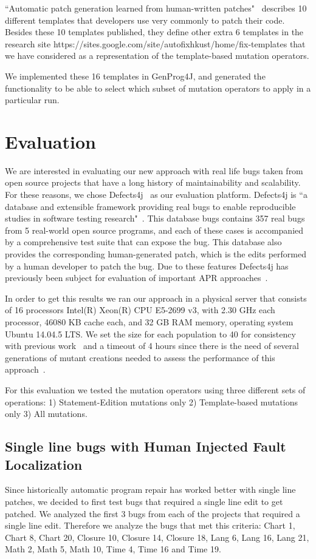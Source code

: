 \documentclass[conference]{IEEEtran}
\begin{document}
``Automatic patch generation learned from human-written patches"~\cite{kim2013} describes 10 different templates that 
developers use very commonly to patch their code. Besides these 10 templates 
published, they define other extra 6 templates in the research site 
https://sites.google.com/site/autofixhkust/home/fix-templates that we have 
considered as a representation of the template-based mutation operators.

We implemented these 16 templates in GenProg4J, and generated the functionality 
to be able to select which subset of mutation operators to apply in a particular 
run.

\section{Evaluation}
We are interested in evaluating our new approach with real life bugs taken from 
open source projects that have a long history of maintainability and 
scalability. For these reasons, we chose Defects4j~\cite{just14} as our 
evaluation platform. Defects4j is ``a database and extensible 
framework providing real bugs to enable reproducible studies in software testing 
research"~\cite{just14}. This database bugs contains 357 real bugs from 5 
real-world open source programs, and each of these cases is accompanied by a 
comprehensive test suite that can expose the bug. This database also provides 
the corresponding human-generated patch, which is the edits performed by a human 
developer to patch the bug. Due to these features Defects4j has previously been 
subject for evaluation of important APR approaches~\cite{Durieux15}.

In order to get this results we ran our approach in a physical server that 
consists of 16 processors Intel(R) Xeon(R) CPU E5-2699 v3, with 2.30 GHz each 
processor, 46080 KB cache each, and 32 GB RAM memory, operating system Ubuntu 
14.04.5 LTS. We set the size for each population to 40 for consistency with 
previous work~\cite{legoues12,kim2013} and a timeout of 4 hours since there is 
the need of several generations of mutant creations needed to assess the 
performance of this approach~\cite{arcuri11}.


For this evaluation we tested the mutation operators using three different sets 
of operations: 1) Statement-Edition mutations only 2) Template-based mutations 
only 3) All mutations.


\subsection{Single line bugs with Human Injected Fault Localization}
Since historically automatic program repair has worked better with single line 
patches, we decided to first test bugs that required a single line edit to get 
patched. We analyzed the first 3 bugs from each of the projects that required a 
single line edit. Therefore we analyze the bugs that met this criteria: Chart 1, 
Chart 8, Chart 20, Closure 10, Closure 14, Closure 18, Lang 6, Lang 16, Lang 21, 
Math 2, Math 5, Math 10, Time 4, Time 16 and Time 19.
\end{document}
